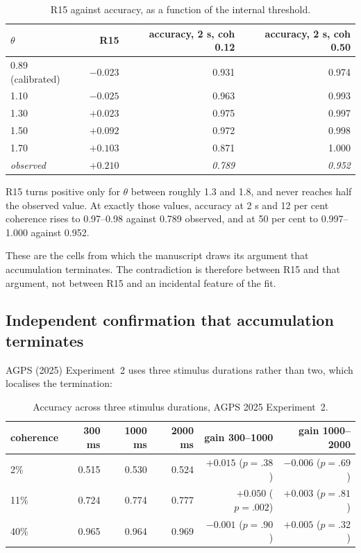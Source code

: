 \documentclass[11pt,a4paper]{article}
\theoremstyle{plain}
\theoremstyle{remark}
\begin{document}
\begin{table}[htbp]
\centering
\caption{R15 against accuracy, as a function of the internal threshold.}
\begin{tabular}{lrrr}
\toprule
$\theta$ & R15 & accuracy, 2 s, coh 0.12 & accuracy, 2 s, coh 0.50\\
\midrule
0.89 (calibrated) & $-0.023$ & 0.931 & 0.974\\
1.10 & $-0.025$ & 0.963 & 0.993\\
1.30 & $+0.023$ & 0.975 & 0.997\\
1.50 & $+0.092$ & 0.972 & 0.998\\
1.70 & $+0.103$ & 0.871 & 1.000\\
\midrule
\emph{observed} & $+0.210$ & \emph{0.789} & \emph{0.952}\\
\bottomrule
\end{tabular}
\end{table}

R15 turns positive only for $\theta$ between roughly 1.3 and 1.8, and never reaches half the
observed value. At exactly those values, accuracy at 2 s and 12 per cent coherence rises to
0.97--0.98 against 0.789 observed, and at 50 per cent to 0.997--1.000 against 0.952.

These are the cells from which the manuscript draws its argument that accumulation
terminates. The contradiction is therefore between R15 and that argument, not between R15
and an incidental feature of the fit.

\subsection{Independent confirmation that accumulation terminates}
\label{sec:terminates}

AGPS (2025) Experiment~2 uses three stimulus durations rather than two, which localises the
termination:

\begin{table}[htbp]
\centering
\caption{Accuracy across three stimulus durations, AGPS 2025 Experiment~2.}
\label{tab:acc3}
\begin{tabular}{lrrrrr}
\toprule
coherence & 300 ms & 1000 ms & 2000 ms & gain 300--1000 & gain 1000--2000\\
\midrule
2\% & 0.515 & 0.530 & 0.524 & $+0.015$ ($p=.38$) & $-0.006$ ($p=.69$)\\
11\% & 0.724 & 0.774 & 0.777 & $+0.050$ ($p=.002$) & $+0.003$ ($p=.81$)\\
40\% & 0.965 & 0.964 & 0.969 & $-0.001$ ($p=.90$) & $+0.005$ ($p=.32$)\\
\bottomrule
\end{tabular}
\end{table}
\end{document}

